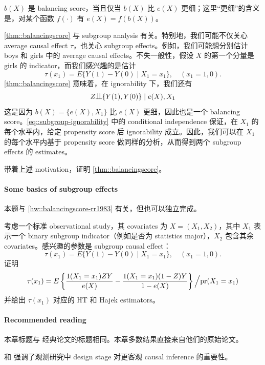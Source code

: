 \begin{theorem}
\label{thm::balancingscore}
$b(X)$ 是 balancing score，当且仅当 $b(X)$ 比 $e(X)$ 更细；这里``更细''的含义是，对某个函数 $f(\cdot)$ 有 $e(X) = f(b(X))$。
\end{theorem}


\cref{thm::balancingscore} 与 subgroup analysis 有关。特别地，我们可能不仅关心 average causal effect $\tau$，也关心 subgroup effects。例如，我们可能想分别估计 boys 和 girls 中的 average causal effects。不失一般性，假设 $X$ 的第一个分量是 girls 的 indicator，而我们感兴趣的是估计
$$
\tau(x_1) = E\{ Y(1) - Y(0) \mid X_1 = x_1  \},\quad (x_1=1,0).
$$
\cref{thm::balancingscore} 意味着，在 ignorability 下，我们还有
\begin{equation}
\label{eq::subgroup-ignorability}
Z\ind \{ Y(1) , Y(0) \} \mid e(X), X_1
\end{equation}
这是因为 $b(X) = \{e(X), X_1\}$ 比 $e(X)$ 更细，因此也是一个 balancing score。\eqref{eq::subgroup-ignorability} 中的 conditional independence 保证，在 $X_1$ 的每个水平内，给定 propensity score 后 ignorability 成立。因此，我们可以在 $X_1$ 的每个水平内基于 propensity score 做同样的分析，从而得到两个 subgroup effects 的 estimates。


带着上述 motivation，证明 \cref{thm::balancingscore}。


\paragraph{Some basics of subgroup effects}

本题与 \cref{hw::balancingscore-rr1983} 有关，但也可以独立完成。

考虑一个标准 observational study，其 covariates 为 $X = (X_1, X_2)$，其中 $X_1$ 表示一个 binary subgroup indicator（例如是否为 statistics major），$X_2$ 包含其余 covariates。感兴趣的参数是 subgroup causal effect：
$$
\tau(x_1) = E\{ Y(1) - Y(0) \mid X_1 = x_1  \},\quad (x_1=1,0).
$$
证明
$$
\tau(x_1) =  E\left\{   \frac{  1(X_1 = x_1) ZY}{ e(X) }   - \frac{  1(X_1 = x_1) (1-Z)Y}{ 1 -  e(X) }    \right\} \Big /  \textup{pr}(X_1 = x_1)
$$
并给出 $\tau(x_1) $ 对应的 HT 和 Hajek estimators。



 \paragraph{Recommended reading}
 
 
本章标题与 \citet{rosenbaum1983central} 经典论文的标题相同。本章多数结果直接来自他们的原始论文。


\citet{rubin2007design} 和 \citet{rubin2008objective} 强调了观测研究中 design stage 对更客观 causal inference 的重要性。
 
